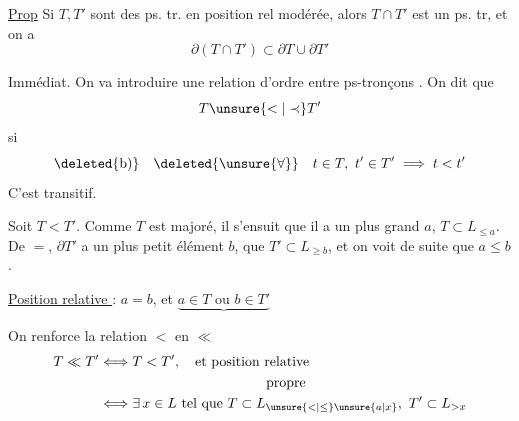 \noindent\llap{\rule[-1.05\baselineskip]{0.4pt}{1.85\baselineskip}\hspace{0.65em}}\uline{Prop} Si $T,T'$ sont des ps. tr. en position rel modérée, alors $T\cap T'$ est  un ps. tr, et on a
\[
\partial(T\cap T')\subset\partial T\cup\partial T'
\]

Immédiat. On va introduire une relation d'ordre entre ps-tronçons . On dit que
\[
T\unsure{<|\prec}T'
\]
si 
\[
\deleted{\text{b)}}\quad\deleted{\unsure{\forall}}\quad t\in T,\ t'\in T'\implies t<t'
\]
C'est  transitif.

Soit $T<T'$. Comme $T$ est majoré, il s'ensuit que  il a un plus grand   $a$,   $T\subset L_{\leq a}$.  De $=$, $\partial T'$ a un plus petit élément $b$,  que $T'\subset L_{\geq b}$,   et on voit de suite que $a\leq b$.

\uline{Position relative  } : $a=b$, et $\underbrace{a\in T\text{ ou }b\in T'}$%


On renforce la relation $<$ en $\ll$
\[
\begin{aligned}
T\ll T' &\Longleftrightarrow T<T',\quad\text{et position relative}\\
&\hspace{12em}\text{propre}\\
&\Longleftrightarrow \exists\,x\in L\text{ tel que }T\subset L_{\unsure{<|\leq}\unsure{a|x}},\ T'\subset L_{>x}
\end{aligned}
\]

